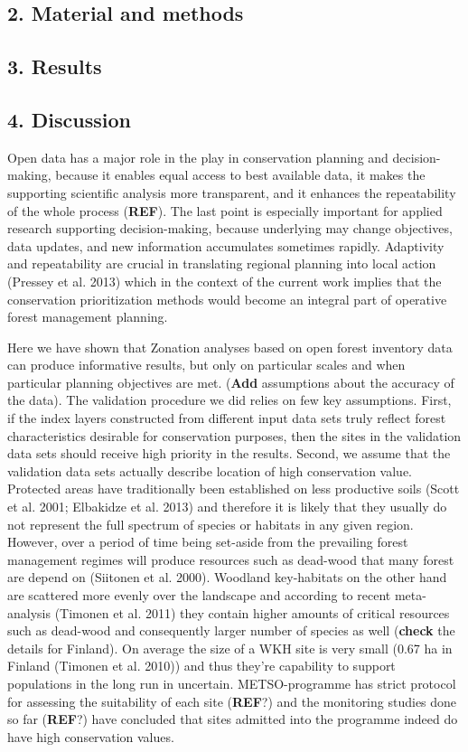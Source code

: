 \documentclass[]{article}
\begin{document}
\subsection{2. Material and methods}

\subsection{3. Results}

\subsection{4. Discussion}

Open data has a major role in the play in conservation planning and
decision-making, because it enables equal access to best available data,
it makes the supporting scientific analysis more transparent, and it
enhances the repeatability of the whole process (\textbf{REF}). The last
point is especially important for applied research supporting
decision-making, because underlying may change objectives, data updates,
and new information accumulates sometimes rapidly. Adaptivity and
repeatability are crucial in translating regional planning into local
action (Pressey et al. 2013) which in the context of the current work
implies that the conservation prioritization methods would become an
integral part of operative forest management planning.

Here we have shown that Zonation analyses based on open forest inventory
data can produce informative results, but only on particular scales and
when particular planning objectives are met. (\textbf{Add} assumptions
about the accuracy of the data). The validation procedure we did relies
on few key assumptions. First, if the index layers constructed from
different input data sets truly reflect forest characteristics desirable
for conservation purposes, then the sites in the validation data sets
should receive high priority in the results. Second, we assume that the
validation data sets actually describe location of high conservation
value. Protected areas have traditionally been established on less
productive soils (Scott et al. 2001; Elbakidze et al. 2013) and
therefore it is likely that they usually do not represent the full
spectrum of species or habitats in any given region. However, over a
period of time being set-aside from the prevailing forest management
regimes will produce resources such as dead-wood that many forest are
depend on (Siitonen et al. 2000). Woodland key-habitats on the other
hand are scattered more evenly over the landscape and according to
recent meta-analysis (Timonen et al. 2011) they contain higher amounts
of critical resources such as dead-wood and consequently larger number
of species as well (\textbf{check} the details for Finland). On average
the size of a WKH site is very small (0.67 ha in Finland (Timonen et al.
2010)) and thus they're capability to support populations in the long
run in uncertain. METSO-programme has strict protocol for assessing the
suitability of each site (\textbf{REF}?) and the monitoring studies done
so far (\textbf{REF}?) have concluded that sites admitted into the
programme indeed do have high conservation values.
\end{document}
